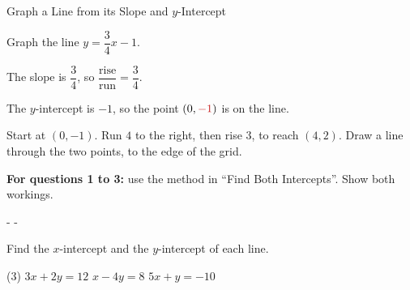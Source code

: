 \documentclass[11pt]{article}
\makeatletter
\newif\ifanswers
\newcommand{\qa}[2]{\ifanswers #2\else #1\fi}
\newcommand{\onlyq}[1]{\ifanswers\else #1\fi}
\newcommand{\sv}[1]{{\color{sub}#1}}
\newcommand{\strand}[1]{\bigskip{\large\bfseries\sffamily #1}\par\smallskip}
\newenvironment{questions}
  {\begin{list}{}{\setlength{\leftmargin}{2.2em}\setlength{\labelwidth}{1.8em}
                  \setlength{\labelsep}{0.4em}\setlength{\itemsep}{0.7em}}}
  {\end{list}}
\newcommand{\roomfor}[1]{\par\penalty\z@\begingroup\setlength{\dimen@}{#1}%
  \dimen@ii\pagegoal\advance\dimen@ii-\pagetotal
  \ifdim\dimen@>\dimen@ii\ifdim\dimen@ii>\z@\vfil\fi\penalty-\@M\fi\endgroup}
\newcommand{\q}[2][5]{\roomfor{#1\baselineskip}\item[\textbf{#2.}]}
\makeatother
\begin{document}
\ifanswers
\strand{Graph a line from its slope and y-intercept}
\else
\begin{example}{Graph a Line from its Slope and $y$-Intercept}
\begin{minipage}[t]{0.52\linewidth}
Graph the line $y = \dfrac34x - 1$.

\smallskip
The slope is $\dfrac34$, so $\dfrac{\text{rise}}{\text{run}} = \dfrac{3}{4}$.

\smallskip
The $y$-intercept is $-1$, so the point $(0, \sv{-1})$ is on the line.

\smallskip
Start at $(0, -1)$. Run $4$ to the right, then rise $3$, to reach
$(4, 2)$. Draw a line through the two points, to the edge of the grid.
\end{minipage}\hfill
\begin{minipage}[t]{0.44\linewidth}
\vspace{0pt}\centering
{}
\end{minipage}
\end{example}
\fi

\onlyq{%
\begin{groupnote}
\textbf{\sffamily For questions 1 to 3:} use the method in ``Find Both Intercepts''. Show both workings.
\end{groupnote}}

\begin{questions}
\q{1} \onlyq{Find the $x$-intercept and the $y$-intercept of each line.}
\begin{tasks}(3)
  \task \qa{$3x + 2y = 12$}{$(4, 0)$ and $(0, 6)$}
  \task \qa{$x - 4y = 8$}{$(8, 0)$ and $(0, -2)$}
  \task \qa{$5x + y = -10$}{$(-2, 0)$ and $(0, -10)$}
\end{tasks}
\end{questions}
\end{document}
